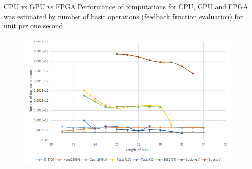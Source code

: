 \documentclass[10pt, compress]{beamer}
\begin{document}
\begin{frame}{CPU vs GPU vs FPGA}
Performance of computations for CPU, GPU and FPGA was estimated by number of basic operations (feedback function evaluation) for unit per one second.
\begin{figure}[ht]
\includegraphics[width=\textwidth]{images/enumeration_fpga.png}
\end{figure}
\end{frame}

\end{document}
